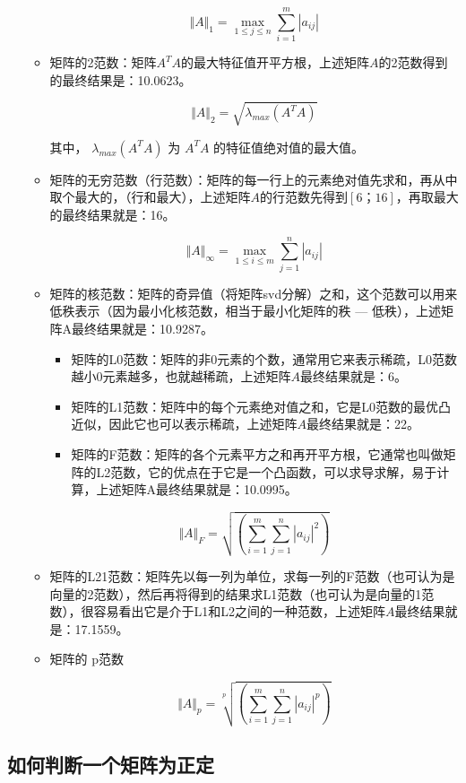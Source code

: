 \begin{itemize}
\begin{itemize}
			$$
			\Vert A\Vert_1=\max_{1\le j\le n}\sum_{i=1}^m|{a_{ij}}|
			$$

		\item 矩阵的2范数：矩阵$A^TA$的最大特征值开平方根，上述矩阵$A$的2范数得到的最终结果是：10.0623。 

			$$
			\Vert A\Vert_2=\sqrt{\lambda_{max}(A^T A)}
			$$

			其中， $\lambda_{max}(A^T A)$ 为 $A^T A$ 的特征值绝对值的最大值。

		\item 矩阵的无穷范数（行范数）：矩阵的每一行上的元素绝对值先求和，再从中取个最大的，（行和最大），上述矩阵$A$的行范数先得到$[6；16]$，再取最大的最终结果就是：16。 

			$$
			\Vert A\Vert_{\infty}=\max_{1\le i \le m}\sum_{j=1}^n |{a_{ij}}|
			$$

		\item 矩阵的核范数：矩阵的奇异值（将矩阵svd分解）之和，这个范数可以用来低秩表示（因为最小化核范数，相当于最小化矩阵的秩 --- 低秩），上述矩阵A最终结果就是：10.9287。  

		\begin{itemize}\itemsep0em
				\item 矩阵的L0范数：矩阵的非0元素的个数，通常用它来表示稀疏，L0范数越小0元素越多，也就越稀疏，上述矩阵$A$最终结果就是：6。
				\item 矩阵的L1范数：矩阵中的每个元素绝对值之和，它是L0范数的最优凸近似，因此它也可以表示稀疏，上述矩阵$A$最终结果就是：22。  
				\item 矩阵的F范数：矩阵的各个元素平方之和再开平方根，它通常也叫做矩阵的L2范数，它的优点在于它是一个凸函数，可以求导求解，易于计算，上述矩阵A最终结果就是：10.0995。  
		\end{itemize}

			$$
			\Vert A\Vert_F=\sqrt{(\sum_{i=1}^m\sum_{j=1}^n{| a_{ij}|}^2)}
			$$

		\item 矩阵的L21范数：矩阵先以每一列为单位，求每一列的F范数（也可认为是向量的2范数），然后再将得到的结果求L1范数（也可认为是向量的1范数），很容易看出它是介于L1和L2之间的一种范数，上述矩阵$A$最终结果就是：17.1559。 

		\item 矩阵的 p范数

			$$
			\Vert A\Vert_p=\sqrt[p]{(\sum_{i=1}^m\sum_{j=1}^n{| a_{ij}|}^p)}
			$$
	\end{itemize}
\end{itemize}

\subsection{如何判断一个矩阵为正定}


